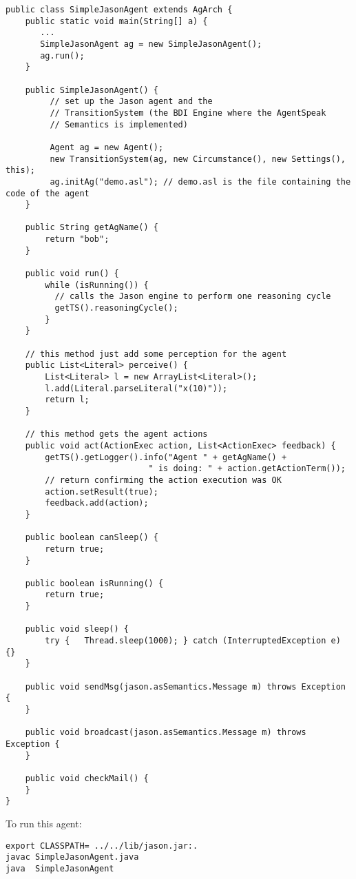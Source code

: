 \documentclass{article}
\begin{document}
\begin{verbatim}
public class SimpleJasonAgent extends AgArch {
    public static void main(String[] a) {
       ...
       SimpleJasonAgent ag = new SimpleJasonAgent();
       ag.run();
    }

    public SimpleJasonAgent() {
         // set up the Jason agent and the 
         // TransitionSystem (the BDI Engine where the AgentSpeak 
         // Semantics is implemented)

         Agent ag = new Agent();
         new TransitionSystem(ag, new Circumstance(), new Settings(), this);
         ag.initAg("demo.asl"); // demo.asl is the file containing the code of the agent
    }
    
    public String getAgName() {
        return "bob";
    }

    public void run() {
        while (isRunning()) {
          // calls the Jason engine to perform one reasoning cycle
          getTS().reasoningCycle();
        }
    }

    // this method just add some perception for the agent
    public List<Literal> perceive() {
        List<Literal> l = new ArrayList<Literal>();
        l.add(Literal.parseLiteral("x(10)"));
        return l;
    }

    // this method gets the agent actions
    public void act(ActionExec action, List<ActionExec> feedback) {
        getTS().getLogger().info("Agent " + getAgName() + 
                             " is doing: " + action.getActionTerm());
        // return confirming the action execution was OK
        action.setResult(true);
        feedback.add(action);
    }

    public boolean canSleep() {
        return true;
    }

    public boolean isRunning() {
        return true;
    }

    public void sleep() {
    	try {   Thread.sleep(1000); } catch (InterruptedException e) {}
    }
    
    public void sendMsg(jason.asSemantics.Message m) throws Exception {
    }

    public void broadcast(jason.asSemantics.Message m) throws Exception {
    }

    public void checkMail() {
    }
}
\end{verbatim}

To run this agent:
\begin{verbatim}
export CLASSPATH= ../../lib/jason.jar:.
javac SimpleJasonAgent.java
java  SimpleJasonAgent
\end{verbatim}
\end{document}
